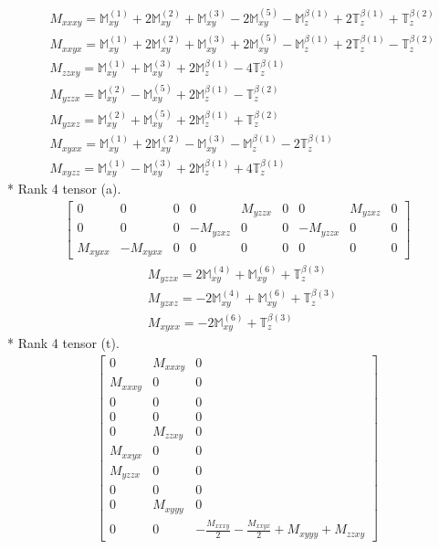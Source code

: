 \documentclass[fleqn,8pt,landscape]{jsarticle}
\begin{document}
\begin{align*}
& M_{xxxy} = \mathbb{M}_{xy}^{(1)} + 2 \mathbb{M}_{xy}^{(2)} + \mathbb{M}_{xy}^{(3)} - 2 \mathbb{M}_{xy}^{(5)} - \mathbb{M}_{z}^{\beta(1)} + 2 \mathbb{T}_{z}^{\beta(1)} + \mathbb{T}_{z}^{\beta(2)} \\
& M_{xxyx} = \mathbb{M}_{xy}^{(1)} + 2 \mathbb{M}_{xy}^{(2)} + \mathbb{M}_{xy}^{(3)} + 2 \mathbb{M}_{xy}^{(5)} - \mathbb{M}_{z}^{\beta(1)} + 2 \mathbb{T}_{z}^{\beta(1)} - \mathbb{T}_{z}^{\beta(2)} \\
& M_{zzxy} = \mathbb{M}_{xy}^{(1)} + \mathbb{M}_{xy}^{(3)} + 2 \mathbb{M}_{z}^{\beta(1)} - 4 \mathbb{T}_{z}^{\beta(1)} \\
& M_{yzzx} = \mathbb{M}_{xy}^{(2)} - \mathbb{M}_{xy}^{(5)} + 2 \mathbb{M}_{z}^{\beta(1)} - \mathbb{T}_{z}^{\beta(2)} \\
& M_{yzxz} = \mathbb{M}_{xy}^{(2)} + \mathbb{M}_{xy}^{(5)} + 2 \mathbb{M}_{z}^{\beta(1)} + \mathbb{T}_{z}^{\beta(2)} \\
& M_{xyxx} = \mathbb{M}_{xy}^{(1)} + 2 \mathbb{M}_{xy}^{(2)} - \mathbb{M}_{xy}^{(3)} - \mathbb{M}_{z}^{\beta(1)} - 2 \mathbb{T}_{z}^{\beta(1)} \\
& M_{xyzz} = \mathbb{M}_{xy}^{(1)} - \mathbb{M}_{xy}^{(3)} + 2 \mathbb{M}_{z}^{\beta(1)} + 4 \mathbb{T}_{z}^{\beta(1)}
\end{align*}
* Rank 4 tensor (a).
\begin{align*}
\begin{bmatrix} 0 & 0 & 0 & 0 & M_{yzzx} & 0 & 0 & M_{yzxz} & 0 \\ 0 & 0 & 0 & - M_{yzxz} & 0 & 0 & - M_{yzzx} & 0 & 0 \\ M_{xyxx} & - M_{xyxx} & 0 & 0 & 0 & 0 & 0 & 0 & 0 \end{bmatrix}
\end{align*}
\begin{align*}
& M_{yzzx} = 2 \mathbb{M}_{xy}^{(4)} + \mathbb{M}_{xy}^{(6)} + \mathbb{T}_{z}^{\beta(3)} \\
& M_{yzxz} = - 2 \mathbb{M}_{xy}^{(4)} + \mathbb{M}_{xy}^{(6)} + \mathbb{T}_{z}^{\beta(3)} \\
& M_{xyxx} = - 2 \mathbb{M}_{xy}^{(6)} + \mathbb{T}_{z}^{\beta(3)}
\end{align*}
* Rank 4 tensor (t).
\begin{align*}
\begin{bmatrix} 0 & M_{xxxy} & 0 \\ M_{xxxy} & 0 & 0 \\ 0 & 0 & 0 \\ 0 & 0 & 0 \\ 0 & M_{zzxy} & 0 \\ M_{xxyx} & 0 & 0 \\ M_{yzzx} & 0 & 0 \\ 0 & 0 & 0 \\ 0 & M_{xyyy} & 0 \\ 0 & 0 & - \frac{M_{xxxy}}{2} - \frac{M_{xxyx}}{2} + M_{xyyy} + M_{zzxy} \end{bmatrix}
\end{align*}
\end{document}
